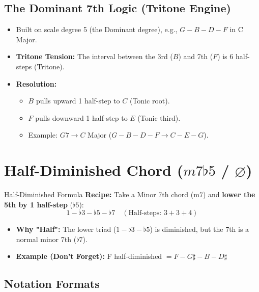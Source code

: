 \subsection{The Dominant 7th Logic (Tritone Engine)}

\begin{itemize}
    \item Built on scale degree 5 (the Dominant degree), e.g., $G - B - D - F$ in C Major.
    \item \textbf{Tritone Tension:} The interval between the 3rd ($B$) and 7th ($F$) is 6 half-steps (Tritone).
    \item \textbf{Resolution:}
    \begin{itemize}
        \item $B$ pulls upward 1 half-step to $C$ (Tonic root).
        \item $F$ pulls downward 1 half-step to $E$ (Tonic third).
        \item Example: $G7 \longrightarrow C$ Major ($G-B-D-F \rightarrow C-E-G$).
    \end{itemize}
\end{itemize}

\section{Half-Diminished Chord \texorpdfstring{($m7\flat 5$ / $\varnothing$)}{(m7b5)}}

\begin{definitionbox}{Half-Diminished Formula}
\textbf{Recipe:} Take a Minor 7th chord ($\text{m7}$) and \textbf{lower the 5th by 1 half-step} ($\flat 5$):
\begin{equation*}
    1 - \flat 3 - \flat 5 - \flat 7 \quad (\text{Half-steps: } 3 + 3 + 4)
\end{equation*}
\begin{itemize}
    \item \textbf{Why "Half":} The lower triad ($1 - \flat 3 - \flat 5$) is diminished, but the 7th is a normal minor 7th ($\flat 7$).
    \item \textbf{Example (Don't Forget):} F half-diminished $= F - G\sharp - B - D\sharp$
\end{itemize}
\end{definitionbox}

\subsection{Notation Formats}

